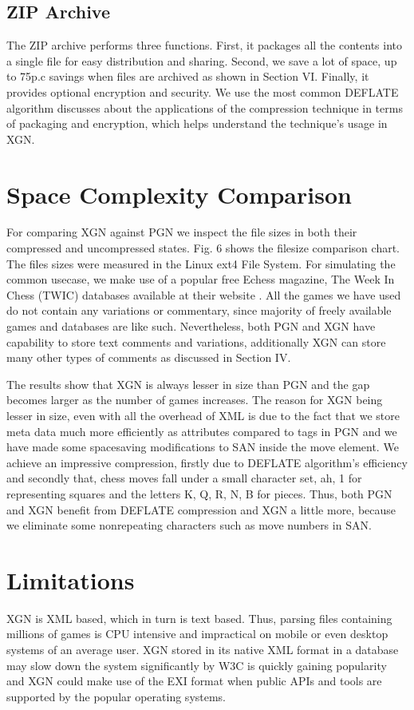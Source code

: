 \documentclass[conference]{IEEEtran}
\begin{document}
\subsection{ZIP Archive}
The ZIP archive performs three functions. First, it packages all the contents into a single file for easy distribution and sharing. Second, we save a lot of space, up to 75p.c savings when files are archived as shown in Section VI. Finally, it provides optional encryption and security. We use the most common DEFLATE algorithm \cite{ab08} discusses about the applications of the compression technique in terms of packaging and encryption, which helps understand the technique's usage in XGN.


\section{Space Complexity Comparison}
For comparing XGN against PGN we inspect the file sizes in both their compressed and uncompressed states. Fig. 6 shows the file\textendash size comparison chart. The files sizes were measured in the Linux ext4 File System. For simulating the common use\textendash case, we make use of a popular free E\textendash chess magazine, The Week In Chess (TWIC) databases available at their website \cite{ab10}. All the games we have used do not contain any variations or commentary, since majority of freely available games and databases are like such. Nevertheless, both PGN and XGN have capability to store text comments and variations, additionally XGN can store many other types of comments as discussed in Section IV.

The results show that XGN is always lesser in size than PGN and the gap becomes larger as the number of games increases. The reason for XGN being lesser in size, even with all the overhead of XML is due to the fact that we store meta data much more efficiently as attributes compared to tags in PGN and we have made some space\textendash saving modifications to SAN inside the move element. We achieve an impressive compression, firstly due to DEFLATE algorithm's efficiency and secondly that, chess moves fall under a small character set, a\textendash h, 1 for representing squares and the letters K, Q, R, N, B for pieces. Thus, both PGN and XGN benefit from DEFLATE compression and XGN a little more, because we eliminate some non\textendash repeating characters such as move numbers in SAN.


\section{Limitations}
XGN is XML based, which in turn is text based. Thus, parsing files containing millions of games is CPU intensive and impractical on mobile or even desktop systems of an average user. XGN stored in its native XML format in a database may slow down the system significantly \cite{ab11} by W3C is quickly gaining popularity and XGN could make use of the EXI format when public APIs and tools are supported by the popular operating systems.
\end{document}
